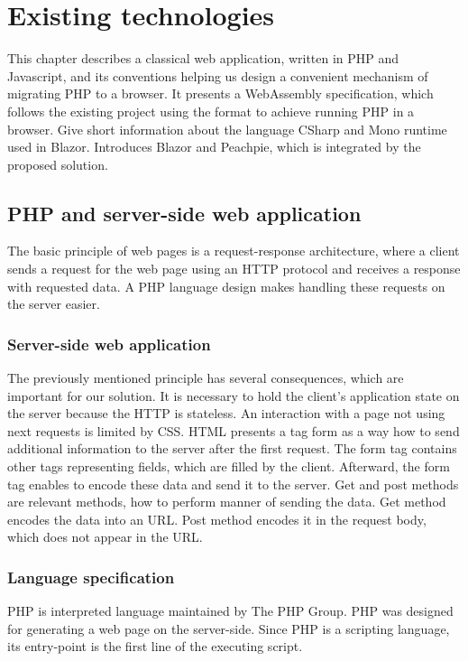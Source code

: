 \chapter{Existing technologies}

This chapter describes a classical web application, written in PHP and Javascript, and its conventions helping us design a convenient mechanism of migrating PHP to a browser.
It presents a WebAssembly specification, which follows the existing project using the format to achieve running PHP in a browser.
Give short information about the language CSharp and Mono runtime used in Blazor.
Introduces Blazor and Peachpie, which is integrated by the proposed solution.

\section{PHP and server-side web application}

The basic principle of web pages is a request-response architecture, where a client sends a request for the web page using an HTTP protocol and receives a response with requested data.
A PHP language design makes handling these requests on the server easier.
 
\subsection{Server-side web application}

The previously mentioned principle has several consequences, which are important for our solution.
It is necessary to hold the client's application state on the server because the HTTP is stateless.
An interaction with a page not using next requests is limited by CSS.
HTML presents a tag form as a way how to send additional information to the server after the first request.
The form tag contains other tags representing fields, which are filled by the client. 
Afterward, the form tag enables to encode these data and send it to the server.
Get and post methods are relevant methods, how to perform manner of sending the data.
Get method encodes the data into an URL.
Post method encodes it in the request body, which does not appear in the URL.

\subsection{Language specification}

PHP \cite{5} is interpreted language maintained by The PHP Group.
PHP was designed for generating a web page on the server-side.
Since PHP is a scripting language, its entry-point is the first line of the executing script.

